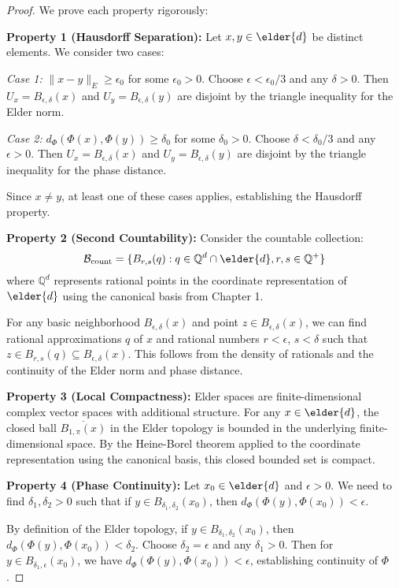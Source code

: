 \begin{proof}
We prove each property rigorously:

\textbf{Property 1 (Hausdorff Separation):}
Let $x, y \in \elder{d}$ be distinct elements. We consider two cases:

\textit{Case 1:} $\|x - y\|_E \geq \epsilon_0$ for some $\epsilon_0 > 0$. 
Choose $\epsilon < \epsilon_0/3$ and any $\delta > 0$. Then $U_x = B_{\epsilon, \delta}(x)$ and $U_y = B_{\epsilon, \delta}(y)$ are disjoint by the triangle inequality for the Elder norm.

\textit{Case 2:} $d_{\Phi}(\Phi(x), \Phi(y)) \geq \delta_0$ for some $\delta_0 > 0$.
Choose $\delta < \delta_0/3$ and any $\epsilon > 0$. Then $U_x = B_{\epsilon, \delta}(x)$ and $U_y = B_{\epsilon, \delta}(y)$ are disjoint by the triangle inequality for the phase distance.

Since $x \neq y$, at least one of these cases applies, establishing the Hausdorff property.

\textbf{Property 2 (Second Countability):}
Consider the countable collection:
$$\mathcal{B}_{\text{count}} = \{B_{r, s}(q) : q \in \mathbb{Q}^d \cap \elder{d}, r, s \in \mathbb{Q}^+\}$$
where $\mathbb{Q}^d$ represents rational points in the coordinate representation of $\elder{d}$ using the canonical basis from Chapter 1.

For any basic neighborhood $B_{\epsilon, \delta}(x)$ and point $z \in B_{\epsilon, \delta}(x)$, we can find rational approximations $q$ of $x$ and rational numbers $r < \epsilon$, $s < \delta$ such that $z \in B_{r, s}(q) \subseteq B_{\epsilon, \delta}(x)$. This follows from the density of rationals and the continuity of the Elder norm and phase distance.

\textbf{Property 3 (Local Compactness):}
Elder spaces are finite-dimensional complex vector spaces with additional structure. For any $x \in \elder{d}$, the closed ball $\overline{B_{1, \pi}(x)}$ in the Elder topology is bounded in the underlying finite-dimensional space. By the Heine-Borel theorem applied to the coordinate representation using the canonical basis, this closed bounded set is compact.

\textbf{Property 4 (Phase Continuity):}
Let $x_0 \in \elder{d}$ and $\epsilon > 0$. We need to find $\delta_1, \delta_2 > 0$ such that if $y \in B_{\delta_1, \delta_2}(x_0)$, then $d_{\Phi}(\Phi(y), \Phi(x_0)) < \epsilon$.

By definition of the Elder topology, if $y \in B_{\delta_1, \delta_2}(x_0)$, then $d_{\Phi}(\Phi(y), \Phi(x_0)) < \delta_2$. Choose $\delta_2 = \epsilon$ and any $\delta_1 > 0$. Then for $y \in B_{\delta_1, \epsilon}(x_0)$, we have $d_{\Phi}(\Phi(y), \Phi(x_0)) < \epsilon$, establishing continuity of $\Phi$.
\end{proof}

